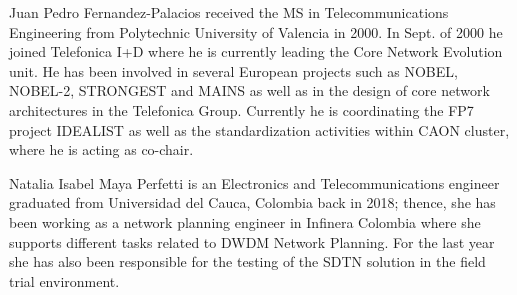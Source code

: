 \documentclass[a4paper,fleqn]{cas-dc}
\begin{document}
\bio{}
Juan Pedro Fernandez-Palacios received the MS in Telecommunications Engineering from Polytechnic University of Valencia in 2000. In Sept. of 2000 he joined Telefonica I+D where he is currently leading the Core Network Evolution unit. He has been involved in several European projects such as NOBEL, NOBEL-2, STRONGEST and MAINS as well as in the design of core network architectures in the Telefonica Group. Currently he is coordinating the FP7 project IDEALIST as well as the standardization activities within CAON cluster, where he is acting as co-chair.
\endbio


Natalia Isabel Maya Perfetti is an Electronics and Telecommunications engineer graduated from Universidad del Cauca, Colombia back in 2018; thence, she has been working as a network planning engineer in Infinera Colombia where she supports different tasks related to DWDM Network Planning. For the last year she has also been responsible for the testing of the SDTN solution in the field trial environment.
\endbio
\end{document}
